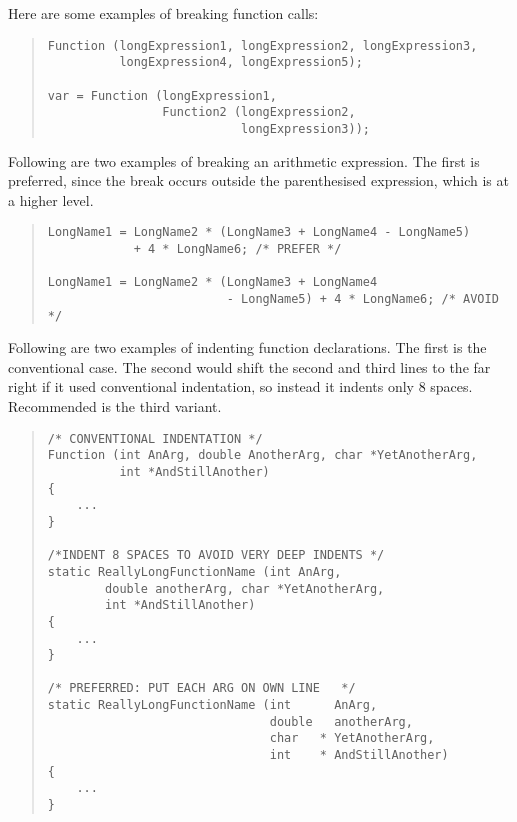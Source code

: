 \documentclass{article}
\begin{document}
Here are some examples of breaking function calls:

\begin{quote}
\begin{verbatim}
Function (longExpression1, longExpression2, longExpression3, 
          longExpression4, longExpression5);
 
var = Function (longExpression1,
                Function2 (longExpression2,
                           longExpression3)); 
\end{verbatim}
\end{quote}

Following are two examples of breaking an arithmetic expression. The
first is preferred, since the break occurs outside the parenthesised
expression, which is at a higher level.

\begin{quote}
\begin{verbatim}
LongName1 = LongName2 * (LongName3 + LongName4 - LongName5)
            + 4 * LongName6; /* PREFER */

LongName1 = LongName2 * (LongName3 + LongName4
                         - LongName5) + 4 * LongName6; /* AVOID */
\end{verbatim}
\end{quote}

Following are two examples of indenting function declarations. The
first is the conventional case. The second would shift the second and
third lines to the far right if it used conventional indentation, so
instead it indents only 8 spaces.  Recommended is the third variant.

\begin{quote}
\begin{verbatim}
/* CONVENTIONAL INDENTATION */
Function (int AnArg, double AnotherArg, char *YetAnotherArg,
          int *AndStillAnother) 
{
    ...
}

/*INDENT 8 SPACES TO AVOID VERY DEEP INDENTS */
static ReallyLongFunctionName (int AnArg,
        double anotherArg, char *YetAnotherArg,
        int *AndStillAnother) 
{
    ...
}

/* PREFERRED: PUT EACH ARG ON OWN LINE   */
static ReallyLongFunctionName (int      AnArg,
                               double   anotherArg, 
                               char   * YetAnotherArg,
                               int    * AndStillAnother) 
{
    ...
}
\end{verbatim}
\end{quote}
\end{document}
